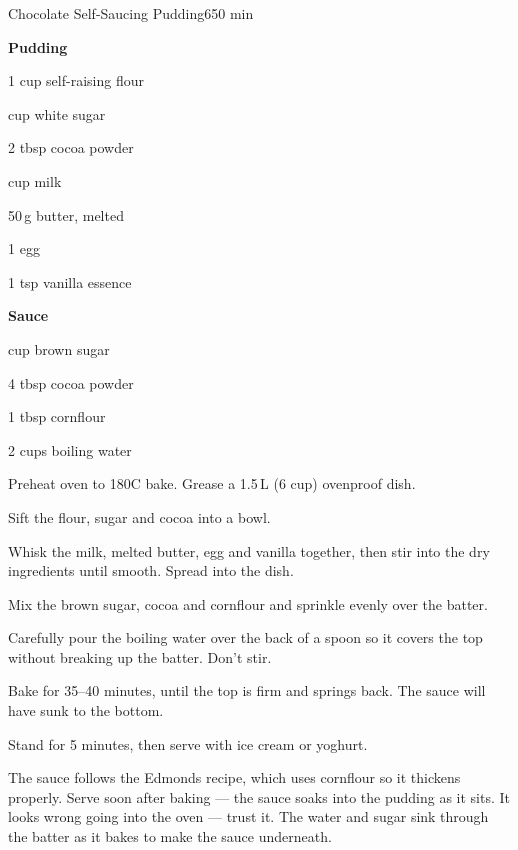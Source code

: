 \begin{recipebox}{Chocolate Self-Saucing Pudding}{6}{50 min}
\begin{ingredients}
  \item[] \textbf{Pudding}
  \item 1 cup self-raising flour
  \item {} cup white sugar
  \item 2 tbsp cocoa powder
  \item {} cup milk
  \item 50\,g butter, melted
  \item 1 egg
  \item 1 tsp vanilla essence
  \item[] \textbf{Sauce}
  \item {} cup brown sugar
  \item 4 tbsp cocoa powder
  \item 1 tbsp cornflour
  \item 2 cups boiling water
\end{ingredients}

\begin{method}
  \item Preheat oven to 180\degree C bake. Grease a 1.5\,L (6 cup) ovenproof dish.
  \item Sift the flour, sugar and cocoa into a bowl.
  \item Whisk the milk, melted butter, egg and vanilla together, then stir into the dry ingredients until smooth. Spread into the dish.
  \item Mix the brown sugar, cocoa and cornflour and sprinkle evenly over the batter.
  \item Carefully pour the boiling water over the back of a spoon so it covers the top without breaking up the batter. Don't stir.
  \item Bake for 35--40 minutes, until the top is firm and springs back. The sauce will have sunk to the bottom.
  \item Stand for 5 minutes, then serve with ice cream or yoghurt.
\end{method}

\begin{notes}
The sauce follows the Edmonds recipe, which uses cornflour so it thickens properly. Serve soon after baking --- the sauce soaks into the pudding as it sits.
It looks wrong going into the oven --- trust it. The water and sugar sink through the batter as it bakes to make the sauce underneath.
\end{notes}
\end{recipebox}

